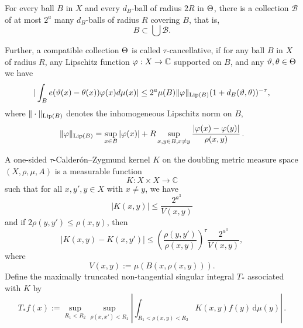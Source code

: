 For every ball $B$ in $X$ and
every $d_B$-ball of radius $2R$ in $\Theta$, there is a collection $\mathcal{B}$ of
at most $2^a$ many  $d_B$-balls of radius $R$ covering $B$, that is,
\begin{equation}\label{thirddb}
    B\subset \bigcup \mathcal{B}.
\end{equation}


Further, a compatible collection $\Theta$ is called $\tau$-cancellative, if
for any ball $B$ in $X$ of radius $R$, any Lipschitz function $\varphi: X\to \mathbb{C}$
supported on $B$, and any $\vartheta,\theta\in \Theta$ we have
\begin{equation}
    \label{eq vdc cond}
    |\int_B e(\vartheta(x)-{\theta(x)}) \varphi(x) d\mu(x)|\le 2^a  \mu(B)\|\varphi\|_{\operatorname{\operatorname{Lip}}(B)}
(1+d_B(\vartheta,\theta))^{-\tau},
\end{equation}
where $\|\cdot\|_{\operatorname{\operatorname{Lip}}(B)}$ denotes the inhomogeneous Lipschitz norm on $B$,
$$
    \|\varphi\|_{\operatorname{\operatorname{Lip}}(B)} = \sup_{x \in B} |\varphi(x)| + R \sup_{x,y \in B, x \neq y} \frac{|\varphi(x) - \varphi(y)|}{\rho(x,y)}\,.
$$




A one-sided $\tau$-Calder\'on--Zygmund kernel $K$ on  the doubling metric measure space $(X, \rho, \mu, A)$ is a measurable function
    \begin{equation}\label{eqkernel0}
K:X\times X\to \mathbb{C}
    \end{equation}
such that for all $x,y',y\in X$ with $x\neq y$, we have
\begin{equation}\label{eqkernel size}
    |K(x,y)| \leq \frac{2^{a^3}}{V(x,y)}
    \end{equation}
    and if $2\rho(y,y') \leq \rho(x,y)$, then
    \begin{equation}
    \label{eqkernel y smooth}
        |K(x,y) - K(x,y')| \leq \left(\frac{\rho(y,y')}{\rho(x,y)}\right)^{\tau}\frac{2^{a^3}}{V(x,y)},
\end{equation}
where  \[V(x,y):=\mu(B(x,\rho(x,y))).\]
Define the maximally truncated non-tangential singular integral $T_{*}$ associated with $K$ by
\begin{equation}
    \label{def tang unm op}
    T_{*}f(x):=\sup_{R_1 < R_2} \sup_{\rho(x,x')<R_1} \left|\int_{R_1< \rho(x,y) < R_2}  K(x,y) f(y)  \, \mathrm{d}\mu(y) \right|\,.
\end{equation}

